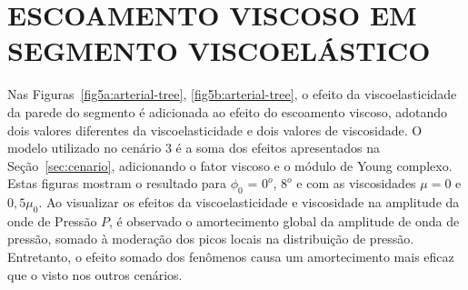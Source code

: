 \section{ESCOAMENTO VISCOSO EM SEGMENTO VISCOELÁSTICO}\label{sec:cenario3}

Nas Figuras~\ref{fig5a:arterial-tree}, \ref{fig5b:arterial-tree}, o efeito da viscoelasticidade da parede do segmento é adicionada ao efeito do escoamento viscoso, adotando dois valores diferentes da viscoelasticidade e dois valores de viscosidade. O modelo utilizado no cenário 3 é a soma dos efeitos apresentados na Seção~\ref{sec:cenario}, adicionando o fator viscoso e o módulo de Young complexo. Estas figuras mostram o resultado para $\phi_0$ = $0^o$, $8^o$ e com as viscosidades $\mu = 0$ e $0,5 \mu_0$. Ao visualizar os efeitos da viscoelasticidade e viscosidade na amplitude da onde de Pressão $P$, é observado o amortecimento global da amplitude de onda de pressão, somado à moderação dos picos locais na distribuição de pressão. Entretanto, o efeito somado dos fenômenos causa um amortecimento mais eficaz que o visto nos outros cenários.

